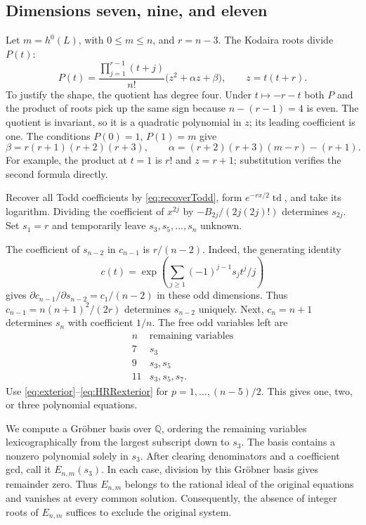 \documentclass[11pt,reqno,letterpaper]{amsart}
\newcommand{\Q}{\mathbb Q}
\newcommand{\td}{\operatorname{td}}
\theoremstyle{definition}
\numberwithin{equation}{section}
\begin{document}
\subsection{Dimensions seven, nine, and eleven}\label{sec:higharith}
Let $m=h^0(L)$, with $0\le m\le n$, and $r=n-3$.
The Kodaira roots divide $P(t)$:
\[
 P(t)=\frac{\prod_{j=1}^{r-1}(t+j)}{n!}
       \bigl(z^2+\alpha z+\beta\bigr),\qquad z=t(t+r).
\]
To justify the shape, the quotient has degree four. Under $t\mapsto-r-t$
both $P$ and the product of roots pick up the same sign because
$n-(r-1)=4$ is even. The quotient is invariant, so it is a quadratic
polynomial in $z$; its leading coefficient is one.
The conditions $P(0)=1$, $P(1)=m$ give
\begin{equation}\label{eq:highP}
 \beta=r(r+1)(r+2)(r+3),\qquad
 \alpha=(r+2)(r+3)(m-r)-(r+1).
\end{equation}
For example, the product at $t=1$ is $r!$ and $z=r+1$;
substitution verifies the second formula directly.

Recover all Todd coefficients by \eqref{eq:recoverTodd}, form
$e^{-rx/2}\td$, and take its logarithm. Dividing the coefficient of $x^{2j}$
by $-B_{2j}/(2j(2j)!)$ determines $s_{2j}$.
Set $s_1=r$ and temporarily leave $s_3,s_5,\ldots,s_n$ unknown.

The coefficient of $s_{n-2}$ in $c_{n-1}$ is $r/(n-2)$.
Indeed, the generating identity
\[
 c(t)=\exp\left(\sum_{j\ge1}(-1)^{j-1}s_jt^j/j\right)
\]
gives $\partial c_{n-1}/\partial s_{n-2}=c_1/(n-2)$ in these odd dimensions.
Thus $c_{n-1}=n(n+1)^2/(2r)$ determines $s_{n-2}$ uniquely.
Next, $c_n=n+1$ determines $s_n$ with coefficient $1/n$.
The free odd variables left are
\[
 \begin{array}{c|c}
 n&\text{remaining variables}\\ \hline
 7&s_3\\9&s_3,s_5\\11&s_3,s_5,s_7.
 \end{array}
\]
Use \eqref{eq:exterior}--\eqref{eq:HRRexterior} for
$p=1,\ldots,(n-5)/2$. This gives one, two, or three polynomial equations.

We compute a Gr\"obner basis over $\Q$, ordering the remaining
variables lexicographically from the largest subscript down to $s_3$.
The basis contains
a nonzero polynomial solely in $s_3$.
After clearing denominators and a coefficient gcd, call it $E_{n,m}(s_3)$.
In each case, division by this Gr\"obner basis gives remainder zero.
Thus $E_{n,m}$ belongs to the rational ideal of the original equations
and vanishes at every common solution.
Consequently, the absence of integer roots of $E_{n,m}$ suffices to
exclude the original system.
\end{document}
